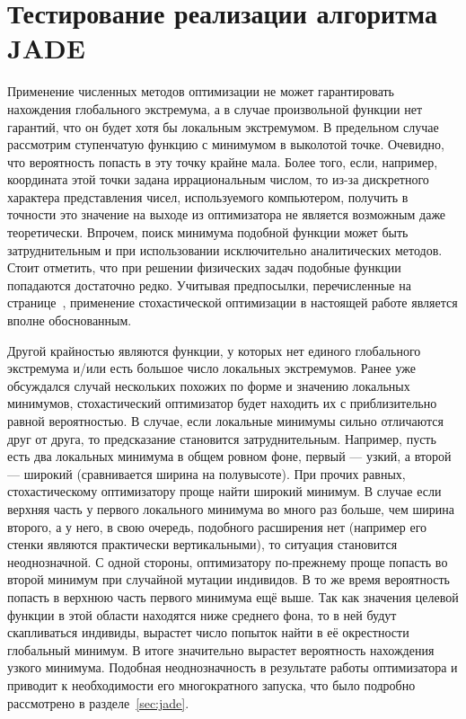 \section{Тестирование реализации алгоритма JADE}
\label{sec:test-jade}
Применение численных методов оптимизации не может
гарантировать нахождения глобального экстремума, а в случае
произвольной функции нет гарантий, что он будет  хотя бы
локальным экстремумом.  В предельном случае рассмотрим ступенчатую
функцию с минимумом в выколотой точке.  Очевидно, что вероятность
попасть в эту точку крайне мала.  Более того, если, например,
координата этой точки задана иррациональным числом, то из-за
дискретного характера представления чисел, используемого компьютером, получить в
точности это значение на выходе из оптимизатора не является возможным
даже теоретически.  Впрочем, поиск минимума подобной функции может
быть затруднительным и при использовании исключительно аналитических
методов.  Стоит отметить, что при решении физических задач подобные
функции попадаются достаточно редко.  Учитывая предпосылки,
перечисленные на странице~\pageref{ref:why-jade}, применение
стохастической оптимизации в настоящей работе является вполне
обоснованным.

Другой крайностью являются функции, у которых нет единого глобального
экстремума и/или есть большое число локальных экстремумов.  Ранее уже
обсуждался случай нескольких похожих по форме и значению
локальных минимумов, стохастический оптимизатор будет находить
их с приблизительно равной вероятностью.  В случае, если локальные
минимумы сильно отличаются друг от друга, то предсказание становится
затруднительным.  Например, пусть есть два локальных минимума в общем
ровном фоне, первый --- узкий, а второй --- широкий (сравнивается ширина
на полувысоте). При прочих равных, стохастическому оптимизатору проще
найти широкий минимум. В случае если верхняя часть у первого
локального минимума во много раз больше, чем ширина второго, а у
него, в свою очередь, подобного расширения нет (например его стенки
являются практически вертикальными), то ситуация становится
неоднозначной.  С одной стороны, оптимизатору по-прежнему проще
попасть во второй минимум при случайной мутации индивидов. В то же
время вероятность попасть в верхнюю часть первого минимума ещё
выше. Так как значения целевой функции в этой области находятся ниже
среднего фона, то в ней будут скапливаться индивиды, вырастет число
попыток найти в её окрестности глобальный минимум.  В итоге
значительно вырастет вероятность нахождения узкого минимума.  Подобная
неоднозначность в результате работы оптимизатора и приводит к
необходимости его многократного запуска, что было подробно рассмотрено
в разделе~\ref{sec:jade}.

